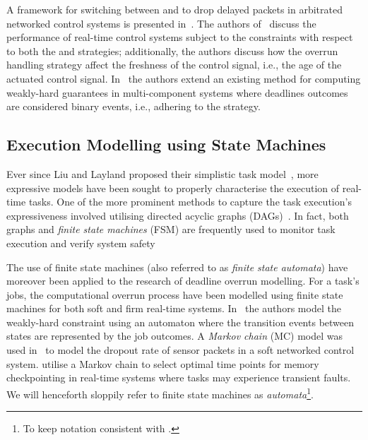 %
A framework for switching between \tK{} and \tS{} to drop delayed packets in arbitrated networked control systems is presented in~\cite{Soudbakhsh:2018}.
The authors of~\cite{Pazzaglia:2018} discuss the performance of real-time control systems subject to the \tAM{} constraints with respect to both the \tK{} and \tS{} strategies; additionally, the authors discuss how the overrun handling strategy affect the freshness of the control signal, i.e., the age of the actuated control signal.
In~\cite{Ernst:2019} the authors extend an existing method for computing weakly-hard guarantees in multi-component systems where deadlines outcomes are considered binary events, i.e., adhering to the \tK{} strategy.


\subsection{Execution Modelling using State Machines}%
\label{sec:background:fsm}%
%
Ever since Liu and Layland proposed their simplistic task model~\cite{Liu:1973}, more expressive models have been sought to properly characterise the execution of real-time tasks.
One of the more prominent methods to capture the task execution's expressiveness involved utilising directed acyclic graphs (DAGs)~\cite{Baruah:2003, Chakraborty:2005, Stigge:2011}.
In fact, both graphs and \emph{finite state machines} (FSM) are frequently used to monitor task execution and verify system safety~\cite{Kumar:2012, Dai:2020, Hertneck:2020}

The use of finite state machines (also referred to as \emph{finite state automata}) have moreover been applied to the research of deadline overrun modelling.
For a task's jobs, the computational overrun process have been modelled using finite state machines for both soft and firm real-time systems.
In~\cite{Horssen:2016} the authors model the \tAM{} weakly-hard constraint using an automaton where the transition events between states are represented by the job outcomes.
A \emph{Markov chain} (MC) model was used in~\cite{Ling:2003} to model the dropout rate of sensor packets in a soft networked control system.
\cite{Kwak:2001} utilise a Markov chain to select optimal time points for memory checkpointing in real-time systems where tasks may experience transient faults.
We will henceforth sloppily refer to finite state machines as \emph{automata}\footnote{To keep notation consistent with .}.

